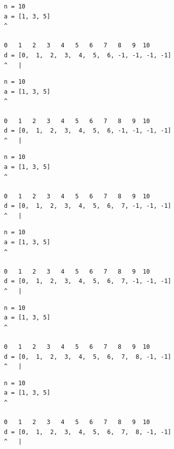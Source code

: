 \begin{frame}[fragile]
\begin{verbatim}
n = 10
a = [1, 3, 5]
^

0   1   2   3   4   5   6   7   8   9  10
d = [0,  1,  2,  3,  4,  5,  6, -1, -1, -1, -1]
^   |
\end{verbatim}
\end{frame}
\addtocounter{framenumber}{-1}

\begin{frame}[fragile]
\begin{verbatim}
n = 10
a = [1, 3, 5]
^

0   1   2   3   4   5   6   7   8   9  10
d = [0,  1,  2,  3,  4,  5,  6, -1, -1, -1, -1]
^   |
\end{verbatim}
\end{frame}
\addtocounter{framenumber}{-1}

\begin{frame}[fragile]
\begin{verbatim}
n = 10
a = [1, 3, 5]
^

0   1   2   3   4   5   6   7   8   9  10
d = [0,  1,  2,  3,  4,  5,  6,  7, -1, -1, -1]
^   |
\end{verbatim}
\end{frame}
\addtocounter{framenumber}{-1}

\begin{frame}[fragile]
\begin{verbatim}
n = 10
a = [1, 3, 5]
^

0   1   2   3   4   5   6   7   8   9  10
d = [0,  1,  2,  3,  4,  5,  6,  7, -1, -1, -1]
^   |
\end{verbatim}
\end{frame}
\addtocounter{framenumber}{-1}

\begin{frame}[fragile]
\begin{verbatim}
n = 10
a = [1, 3, 5]
^

0   1   2   3   4   5   6   7   8   9  10
d = [0,  1,  2,  3,  4,  5,  6,  7,  8, -1, -1]
^   |
\end{verbatim}
\end{frame}
\addtocounter{framenumber}{-1}

\begin{frame}[fragile]
\begin{verbatim}
n = 10
a = [1, 3, 5]
^

0   1   2   3   4   5   6   7   8   9  10
d = [0,  1,  2,  3,  4,  5,  6,  7,  8, -1, -1]
^   |
\end{verbatim}
\end{frame}
\addtocounter{framenumber}{-1}


